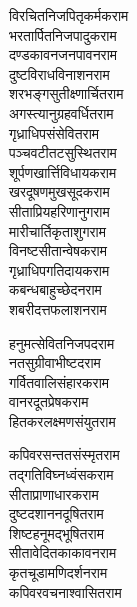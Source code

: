 \begin{large}
\begin{multicols}{2}
विरचितनिजपितृकर्मक\hfill राम\\
भरतार्पितनिजपादुक\hfill राम\\
\jaya
{}
दण्डकावनजनपावन\hfill राम\\
दुष्टविराधविनाशन\hfill राम\\
शरभङ्गसुतीक्ष्णार्चित\hfill राम\\
अगस्त्यानुग्रहवर्धित\hfill राम\\
गृध्राधिपसंसेवित\hfill राम\\
पञ्चवटीतटसुस्थित\hfill राम\\
शूर्पणखार्त्तिविधायक\hfill राम\\
खरदूषणमुखसूदक\hfill राम\\
सीताप्रियहरिणानुग\hfill राम\\
मारीचार्तिकृताशुग\hfill राम\\
विनष्टसीतान्वेषक\hfill राम\\
गृध्राधिपगतिदायक\hfill राम\\
कबन्धबाहुच्छेदन\hfill राम\\
शबरीदत्तफलाशन\hfill राम\\
\jaya

हनुमत्सेवितनिजपद\hfill राम\\
नतसुग्रीवाभीष्टद\hfill राम\\
गर्वितवालिसंहारक\hfill राम\\
वानरदूतप्रेषक\hfill राम\\
हितकरलक्ष्मणसंयुत\hfill राम\\
\jaya

कपिवरसन्ततसंस्मृत\hfill राम\\
तद्गतिविघ्नध्वंसक\hfill राम\\
सीताप्राणाधारक\hfill राम\\
दुष्टदशाननदूषित\hfill राम\\
शिष्टहनूमद्भूषित\hfill राम\\
सीतावेदितकाकावन\hfill राम\\
कृतचूडामणिदर्शन\hfill राम\\
कपिवरवचनाश्वासित\hfill राम\\
\jaya


\end{multicols}
\end{large}

